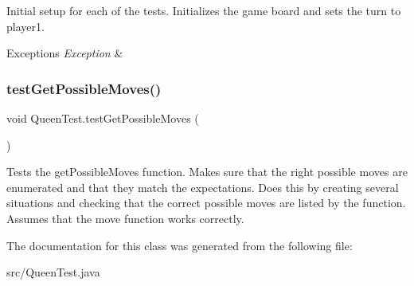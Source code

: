Initial setup for each of the tests. Initializes the game board and sets the turn to player1. 
\begin{DoxyExceptions}{Exceptions}
{\em Exception} & \\
\hline
\end{DoxyExceptions}
\mbox{\label{class_queen_test_a8442b3f0820f52a727610b475de84514}} 
\subsubsection{\texorpdfstring{test\+Get\+Possible\+Moves()}{testGetPossibleMoves()}}
{\footnotesize\ttfamily void Queen\+Test.\+test\+Get\+Possible\+Moves (\begin{DoxyParamCaption}{ }\end{DoxyParamCaption})}

Tests the get\+Possible\+Moves function. Makes sure that the right possible moves are enumerated and that they match the expectations. Does this by creating several situations and checking that the correct possible moves are listed by the function. Assumes that the move function works correctly. 

The documentation for this class was generated from the following file\+:\begin{DoxyCompactItemize}
\item 
src/Queen\+Test.\+java\end{DoxyCompactItemize}
